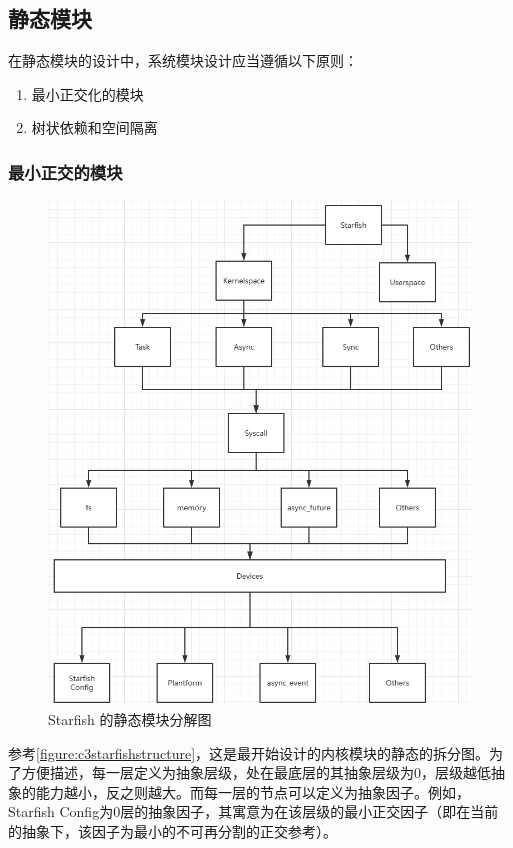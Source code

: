 \subsection{静态模块}

在静态模块的设计中，系统模块设计应当遵循以下原则：

\begin{enumerate}
    \item 最小正交化的模块
    \item 树状依赖和空间隔离
\end{enumerate}

\subsubsection{最小正交的模块}


\begin{figure}[htb]
    \figureCapSet
    \centering
    \includegraphics[width=.8\linewidth]{figure/c3/starfishstructure.png}
    \caption{Starfish 的静态模块分解图}
    \label{figure:c3starfishstructure}
\end{figure}

参考\autoref{figure:c3starfishstructure}，这是最开始设计的内核模块的静态的拆分图。为了方便描述，每一层定义为抽象层级，处在最底层的其抽象层级为0，层级越低抽象的能力越小，反之则越大。而每一层的节点可以定义为抽象因子。例如，Starfish Config为0层的抽象因子，其寓意为在该层级的最小正交因子（即在当前的抽象下，该因子为最小的不可再分割的正交参考）。

